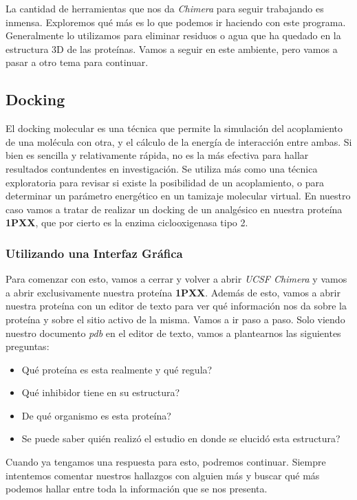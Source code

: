 \documentclass[10pt,letterpaper]{article}
\begin{document}
La cantidad de herramientas que nos da \textit{Chimera} para seguir trabajando es inmensa. Exploremos qu\'e m\'as es lo que podemos ir haciendo con este programa. Generalmente lo utilizamos para eliminar residuos o agua que ha quedado en la estructura 3D de las prote\'inas. Vamos a seguir en este ambiente, pero vamos a pasar a otro tema para continuar.

\subsection{Docking}
El docking molecular es una t\'ecnica que permite la simulaci\'on del acoplamiento de una mol\'ecula con otra, y el c\'alculo de la energ\'ia de interacci\'on entre ambas. Si bien es sencilla y relativamente r\'apida, no es la m\'as efectiva para hallar resultados contundentes en investigaci\'on. Se utiliza m\'as como una t\'ecnica exploratoria para revisar si existe la posibilidad de un acoplamiento, o para determinar un par\'ametro energ\'etico en un tamizaje molecular virtual. En nuestro caso vamos a tratar de realizar un docking de un analg\'esico en nuestra prote\'ina \textbf{1PXX}, que por cierto es la enzima ciclooxigenasa tipo 2.\\

\subsubsection{Utilizando una Interfaz Gr\'afica}

Para comenzar con esto, vamos a cerrar y volver a abrir \textit{UCSF Chimera} y vamos a abrir exclusivamente nuestra prote\'ina \textbf{1PXX}. Adem\'as de esto, vamos a abrir nuestra prote\'ina con un editor de texto para ver qu\'e informaci\'on nos da sobre la prote\'ina y sobre el sitio activo de la misma. Vamos a ir paso a paso. Solo viendo nuestro documento \emph{pdb} en el editor de texto, vamos a plantearnos las siguientes preguntas:

\begin{itemize}
\item Qu\'e prote\'ina es esta realmente y qu\'e regula?
\item Qu\'e inhibidor tiene en su estructura?
\item De qu\'e organismo es esta prote\'ina?
\item Se puede saber qui\'en realiz\'o el estudio en donde se elucid\'o esta estructura?
\end{itemize}

Cuando ya tengamos una respuesta para esto, podremos continuar. Siempre intentemos comentar nuestros hallazgos con alguien m\'as y buscar qu\'e m\'as podemos hallar entre toda la informaci\'on que se nos presenta.\\
\end{document}
